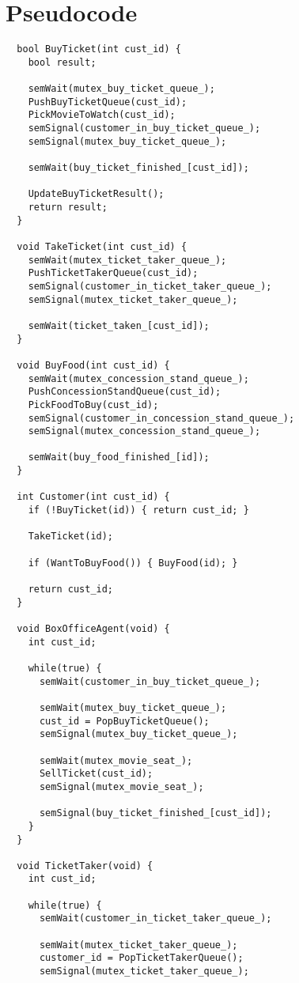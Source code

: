 \documentclass[a4paper]{report}
\begin{document}
\section*{Pseudocode}
\begin{lstlisting}
  bool BuyTicket(int cust_id) {
    bool result;

    semWait(mutex_buy_ticket_queue_);
    PushBuyTicketQueue(cust_id);
    PickMovieToWatch(cust_id);
    semSignal(customer_in_buy_ticket_queue_);
    semSignal(mutex_buy_ticket_queue_);

    semWait(buy_ticket_finished_[cust_id]);

    UpdateBuyTicketResult();
    return result;
  }

  void TakeTicket(int cust_id) {
    semWait(mutex_ticket_taker_queue_);
    PushTicketTakerQueue(cust_id);
    semSignal(customer_in_ticket_taker_queue_);
    semSignal(mutex_ticket_taker_queue_);

    semWait(ticket_taken_[cust_id]);
  }

  void BuyFood(int cust_id) {
    semWait(mutex_concession_stand_queue_);
    PushConcessionStandQueue(cust_id);
    PickFoodToBuy(cust_id);
    semSignal(customer_in_concession_stand_queue_);
    semSignal(mutex_concession_stand_queue_);

    semWait(buy_food_finished_[id]);
  }

  int Customer(int cust_id) {
    if (!BuyTicket(id)) { return cust_id; }

    TakeTicket(id);

    if (WantToBuyFood()) { BuyFood(id); }

    return cust_id;
  }

  void BoxOfficeAgent(void) {
    int cust_id;

    while(true) {
      semWait(customer_in_buy_ticket_queue_);

      semWait(mutex_buy_ticket_queue_);
      cust_id = PopBuyTicketQueue();
      semSignal(mutex_buy_ticket_queue_);

      semWait(mutex_movie_seat_);
      SellTicket(cust_id);
      semSignal(mutex_movie_seat_);

      semSignal(buy_ticket_finished_[cust_id]);
    }
  }

  void TicketTaker(void) {
    int cust_id;

    while(true) {
      semWait(customer_in_ticket_taker_queue_);

      semWait(mutex_ticket_taker_queue_);
      customer_id = PopTicketTakerQueue();
      semSignal(mutex_ticket_taker_queue_);


\end{lstlisting}
\end{document}
